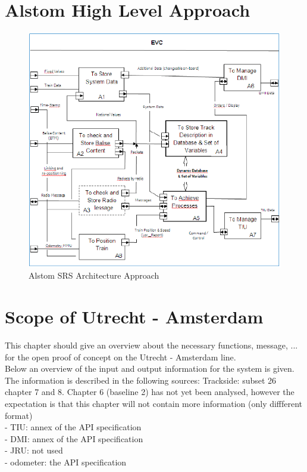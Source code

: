\documentclass{template/openetcs_report}
\begin{document}
\chapter{Alstom High Level Approach}
 \begin{figure}[hbtp]
\centering
\includegraphics [scale=0.8] {images/Alstom_High_Level_Approach}
\caption{Alstom SRS Architecture Approach}
\end{figure}

\newpage

\chapter{Scope of Utrecht - Amsterdam}
This chapter should give an overview about the necessary functions, message, ... for the open proof of concept on the Utrecht - Amsterdam line.\\

Below an overview of the input and output information for the system is given. The information is described in the following sources:
Trackside: subset 26 chapter 7 and 8. Chapter 6 (baseline 2) has not yet been analysed, however the expectation is that this chapter will not contain more information (only diffferent format)\\

- TIU: annex of the API specification\\
- DMI: annex of the API specification\\
- JRU: not used\\
- odometer: the API specification\\
\end{document}
